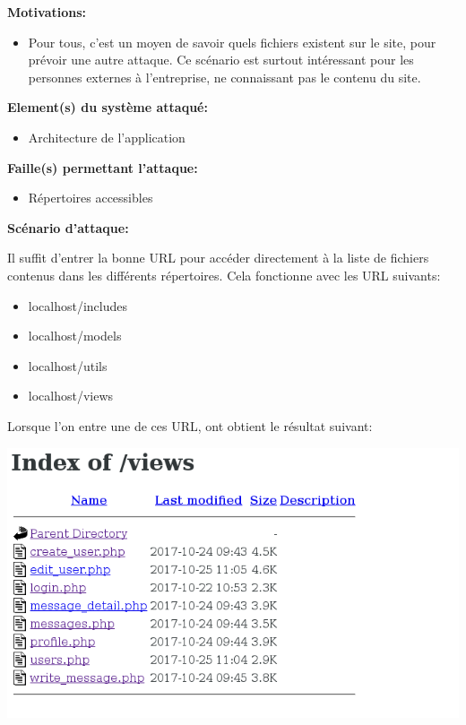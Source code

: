\documentclass{article}
\begin{document}
\textbf{Motivations:}

\begin{itemize}

\item
  Pour tous, c'est un moyen de savoir quels fichiers existent sur le
  site, pour prévoir une autre attaque. Ce scénario est surtout
  intéressant pour les personnes externes à l'entreprise, ne connaissant
  pas le contenu du site.
\end{itemize}

\textbf{Element(s) du système attaqué:}

\begin{itemize}

\item
  Architecture de l'application
\end{itemize}

\textbf{Faille(s) permettant l'attaque:}

\begin{itemize}

\item
  Répertoires accessibles
\end{itemize}

\textbf{Scénario d'attaque:}

Il suffit d'entrer la bonne URL pour accéder directement à la liste de
fichiers contenus dans les différents répertoires. Cela fonctionne avec
les URL suivants:

\begin{itemize}

\item
  localhost/includes
\item
  localhost/models
\item
  localhost/utils
\item
  localhost/views
\end{itemize}

Lorsque l'on entre une de ces URL, ont obtient le résultat suivant:

\includegraphics{images/repertoire.png}
\end{document}
